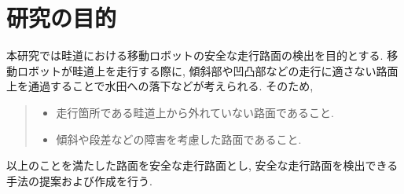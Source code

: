 \section{研究の目的}
本研究では畦道における移動ロボットの安全な走行路面の検出を目的とする. 
移動ロボットが畦道上を走行する際に, 傾斜部や凹凸部などの走行に適さない路面上を通過することで水田への落下などが考えられる. 
そのため,    
\begin{quote}
 \begin{itemize}
  \item 走行箇所である畦道上から外れていない路面であること. 
  \item 傾斜や段差などの障害を考慮した路面であること. 
 \end{itemize}
\end{quote}
以上のことを満たした路面を安全な走行路面とし, 安全な走行路面を検出できる手法の提案および作成を行う. 

%
